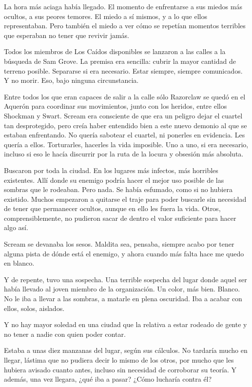 La hora más aciaga había llegado. El momento de enfrentarse a sus miedos más ocultos, a sus peores temores. El miedo a sí mismos, y a lo que ellos representaban. Pero también el miedo a ver cómo se repetían momentos terribles que esperaban no tener que revivir jamás.

\fancyparbreak
Todos los miembros de Los Caídos disponibles se lanzaron a las calles a la búsqueda de Sam Grove. La premisa era sencilla: cubrir la mayor cantidad de terreno posible. Separarse si era necesario. Estar siempre, siempre comunicados. Y no morir. Eso, bajo ninguna circunstancia.

Entre todos los que eran capaces de salir a la calle sólo Razorclaw se quedó en el Aquerón para coordinar sus movimientos, junto con los heridos, entre ellos Shockman y Swart. Scream era consciente de que era un peligro dejar el cuartel tan desprotegido, pero creía haber entendido bien a este nuevo demonio al que se estaban enfrentando. No quería sabotear el cuartel, ni ponerles en evidencia. Les quería a ellos. Torturarles, hacerles la vida imposible. Uno a uno, si era necesario, incluso si eso le hacía discurrir por la ruta de la locura y obsesión más absoluta.

Buscaron por toda la ciudad. En los lugares más infectos, más horribles existentes. Allí donde su enemigo podría hacer el mejor uso posible de las sombras que le rodeaban. Pero nada. Se había esfumado, como si no hubiera existido. Muchos empezaron a quitarse el traje para poder buscarle sin necesidad de tener que permanecer ocultos, aunque en ello les fuera la vida. Otros, comprensiblemente, no pudieron sacar de dentro el valor suficiente para hacer algo así.

Scream se devanaba los sesos. Maldita sea, pensaba, siempre acabo por tener alguna pista de dónde está el enemigo, y ahora cuando más falta hace me quedo en blanco.

Y de repente, tuvo una sospecha. Una terrible sospecha del lugar donde aquel ser había llevado al joven miembro de la organización. Un color, más bien. Blanco. No le iba a llevar a las sombras, a matarle en plena oscuridad. Iba a acabar con ellos, solos, aislados.

Y no hay mayor soledad en una ciudad que la relativa a estar rodeado de gente y no tener a nadie con quien poder contar.

Estaba a unas diez manzanas del lugar, según sus cálculos. No tardaría mucho en llegar, lástima que no pudiera decir lo mismo de los otros, por mucho que les hubiera avisado cuanto antes, incluso sin necesidad de corroborar su teoría. Y además, una vez llegara, ¿qué iba a pasar? ¿Cómo lucharía contra él?

